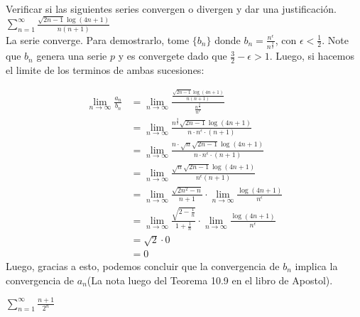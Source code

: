 \documentclass[../main.tex]{subfiles}
\begin{document}
Verificar si las siguientes series convergen o divergen y dar una justificación.
\question $\sum\limits_{n = 1}^\infty \frac{\sqrt{2n-1} \log(4n+1)}{n(n+1)}$\\

La serie converge. Para demostrarlo, tome $\{b_n\}$ donde $b_n = \frac{n^\epsilon}{n^\frac{3}{2}}$, con $\epsilon < \frac{1}{2}$. Note que $b_n$ genera una serie $p$ y es convergete dado que $\frac{3}{2} - \epsilon > 1$. Luego, si hacemos el limite de los terminos de ambas sucesiones:

\begin{align*}
    \lim_{n \to \infty} \frac{a_n}{b_n} &= \lim_{n \to \infty} \frac{\frac{\sqrt{2n-1} \log(4n+1)}{n(n+1)}}{\frac{n^\frac{3}{2}}{n^\epsilon}}\\
    &= \lim_{n \to \infty} \frac{n^\frac{3}{2}\sqrt{2n-1} \log(4n+1)}{n \cdot n^\epsilon \cdot (n+1)}\\
    &= \lim_{n \to \infty} \frac{n \cdot \sqrt{n} \sqrt{2n-1} \log(4n+1)}{n \cdot n^\epsilon \cdot (n+1)}\\
    &= \lim_{n \to \infty} \frac{\sqrt{n} \sqrt{2n-1} \log(4n+1)}{n^\epsilon (n+1)}\\
    &= \lim_{n \to \infty} \frac{\sqrt{2n^2 - n}}{n+1} \cdot \lim_{n \to \infty} \frac{\log(4n+1)}{n^\epsilon}\\
    &= \lim_{n \to \infty} \frac{\sqrt{2 - \frac{1}{n}}}{1+\frac{1}{n}} \cdot \lim_{n \to \infty} \frac{\log(4n+1)}{n^\epsilon}\\
    &= \sqrt{2} \cdot 0\\
    &= 0
\end{align*}
Luego, gracias a esto, podemos concluir que la convergencia de $b_n$ implica la convergencia de $a_n$(La nota luego del Teorema 10.9 en el libro de Apostol).


\question $\sum\limits_{n = 1}^\infty \frac{n+1}{2^n}$
\end{document}
